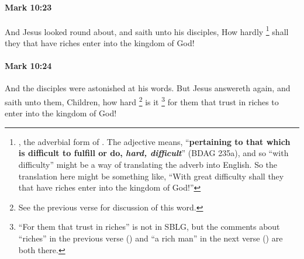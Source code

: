 		\paragraph{Mark 10:23} %
			\label{MARK-10-23}

			And Jesus looked round about, and saith unto his disciples, How hardly%
				\footnote{%
					, the adverbial form of . The adjective means, ``\textbf{pertaining to that which is difficult to fulfill or do, \textit{hard, difficult}}'' (BDAG 235a), and so ``with difficulty'' might be a way of translating the adverb into English. So the translation here might be something like, ``With great difficulty shall they that have riches enter into the kingdom of God!''
					}
			shall they that have riches enter into the kingdom of God!

			\begin{framed}
			\scriptsize
				\begin{compactdesc}
					\item[SBLG] 
				\end{compactdesc}
			\end{framed}

		\paragraph{Mark 10:24} %
			\label{MARK-10-24}

			And the disciples were astonished at his words. But Jesus answereth again, and saith unto them, Children, how hard%
				\footnote{%
					See the previous verse for discussion of this word.
					}
			is it
				\footnote{%
					``For them that trust in riches'' is not in SBLG, but the comments about ``riches'' in the previous verse () and ``a rich man'' in the next verse () are both there.
					}%
			for them that trust in riches to enter into the kingdom of God!

